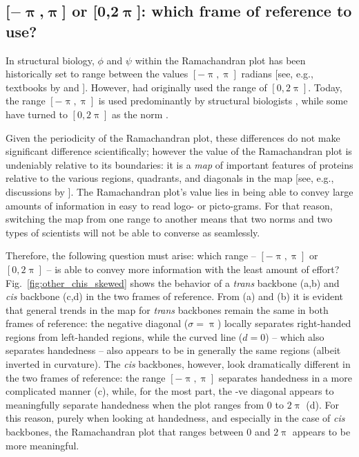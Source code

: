 \documentclass[fleqn,10pt,lineno]{wlpeerj} %
\newcommand{\n}[1]{{\color{blue}#1}}
\newcommand{\Fig}[1]{Fig.~\ref{#1}}
\newcommand{\cis}{{\em cis}\xspace}
\newcommand{\trans}{{\em trans}\xspace}
\begin{document}
\subsection*{[$\bm{-\uppi}$,$\bm{\uppi}$] or [$\bm{0}$,$\bm{2\uppi}$]: which frame of reference to use?} 
In structural biology, $\phi$ and $\psi$ within the Ramachandran plot has been historically set to range between the values $[-\uppi,\uppi]$ radians [see, e.g., textbooks by \cite{Berg2006} and \cite{Alberts2002}]. However, \cite{Ramachandran1963} had originally used the range of $[0,2\uppi]$. Today, the range $[-\uppi,\uppi]$ is used predominantly by structural biologists \citep{Laskowski1993,Laskowski2003,Zacharias2013}, while some have turned to $[0,2\uppi]$ as the norm \citep{Nemethy1966,Voelz2011}. 

Given the periodicity of the Ramachandran plot, these differences do not make \n{significant} difference scientifically; however the value of the Ramachandran plot is undeniably relative to its boundaries: it is a {\em map} of important features of proteins relative to the various regions, quadrants, and diagonals in the map [see, e.g., discussions by \cite{Beck2008}]. The Ramachandran plot's value lies in being able to convey large amounts of information in easy to read logo- or picto-grams. For that reason, switching the map from one range to another means that two norms and two types of scientists will not be able to converse as seamlessly.

Therefore, the following question must arise: which range -- $[-\uppi,\uppi]$ or $[0,2\uppi]$ -- is able to convey more information with the least amount of effort? \Fig{fig:other_chis_skewed} shows the behavior of a \trans backbone (a,b) and \cis backbone (c,d) in the two frames of reference. From (a) and (b) it is evident that general trends in the map for \trans backbones remain the same in both frames of reference: the negative diagonal ($\sigma=\uppi$) locally separates right-handed regions from left-handed regions, while the curved line ($d=0$) -- which also separates handedness -- also appears to be in generally the same regions (albeit inverted in curvature). The \cis backbones, however, look dramatically different in the two frames of reference: the range $[-\uppi,\uppi]$ separates handedness in a more complicated manner (c), \n{while, for the most part,} the -ve diagonal appears \n{to} meaningfully \n{separate} handedness when the plot ranges from $0$ to $2\uppi$ (d). For this reason, purely when looking at handedness, and especially in the case of \cis backbones, the Ramachandran plot that ranges between 0 and $2\uppi$ appears to be more meaningful.
\end{document}
